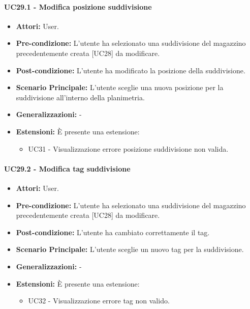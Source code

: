\paragraph{UC29.1 - Modifica posizione suddivisione}
\begin{itemize}
    \item \textbf{Attori:} User.
    \item \textbf{Pre-condizione:} L'utente ha selezionato una suddivisione del magazzino precedentemente creata [UC28] da modificare.
    \item \textbf{Post-condizione:} L'utente ha modificato la posizione della suddivisione.
    \item \textbf{Scenario Principale:} L'utente sceglie una nuova posizione per la suddivisione all'interno della planimetria.
    \item \textbf{Generalizzazioni:} -
    \item \textbf{Estensioni:} È presente una estensione:
        \begin{itemize}
            \item UC31 - Visualizzazione errore posizione suddivisione non valida.
        \end{itemize}
\end{itemize}

\paragraph{UC29.2 - Modifica tag suddivisione}
\begin{itemize}
    \item \textbf{Attori:} User.
    \item \textbf{Pre-condizione:}  L'utente ha selezionato una suddivisione del magazzino precedentemente creata [UC28] da modificare.
    \item \textbf{Post-condizione:} L'utente ha cambiato correttamente il tag.
    \item \textbf{Scenario Principale:} L'utente sceglie un nuovo tag per la suddivisione.
    \item \textbf{Generalizzazioni:} -
    \item \textbf{Estensioni:} È presente una estensione:
        \begin{itemize}
            \item UC32 - Visualizzazione errore tag non valido.
        \end{itemize}
\end{itemize}

